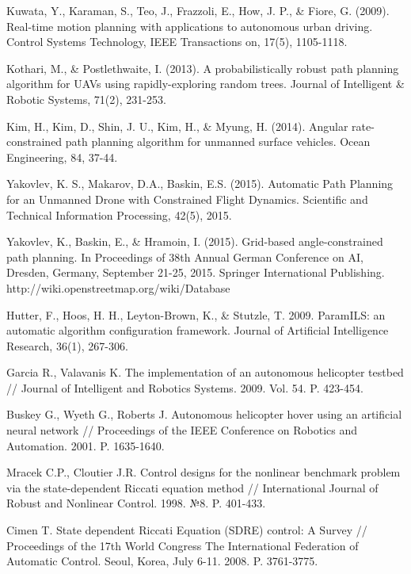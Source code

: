\documentclass[review]{elsarticle}
\begin{document}
\begin{thebibliography}{9}
	 Kuwata, Y., Karaman, S., Teo, J., Frazzoli, E., How, J. P., \& Fiore, G. (2009). Real-time motion planning with applications to autonomous urban driving. Control Systems Technology, IEEE Transactions on, 17(5), 1105-1118.
	
	 Kothari, M., \& Postlethwaite, I. (2013). A probabilistically robust path planning algorithm for UAVs using rapidly-exploring random trees. Journal of Intelligent \& Robotic Systems, 71(2), 231-253.
	
	 Kim, H., Kim, D., Shin, J. U., Kim, H., \& Myung, H. (2014). Angular rate-constrained path planning algorithm for unmanned surface vehicles. Ocean Engineering, 84, 37-44.
	
	 Yakovlev, K. S., Makarov, D.A., Baskin, E.S. (2015). Automatic Path Planning for an Unmanned Drone with Constrained Flight Dynamics. Scientific and Technical Information Processing, 42(5), 2015.
	
	 Yakovlev, K., Baskin, E., \& Hramoin, I. (2015). Grid-based angle-constrained path planning. In Proceedings of 38th Annual German Conference on AI, Dresden, Germany, September 21-25, 2015. Springer International Publishing.
	 http://wiki.openstreetmap.org/wiki/Database
	
	 Hutter, F., Hoos, H. H., Leyton-Brown, K., \& Stutzle, T. 2009. ParamILS: an automatic algorithm configuration framework. Journal of Artificial Intelligence Research, 36(1), 267-306.
	
	 Garcia R., Valavanis K. The implementation of an autonomous helicopter testbed // Journal of Intelligent and Robotics Systems. 2009. Vol. 54. P. 423-454.
	
	 Buskey G., Wyeth G., Roberts J. Autonomous helicopter hover using an artificial neural network // Proceedings of the IEEE Conference on Robotics and Automation. 2001. P. 1635-1640.
	
	 Mracek C.P., Cloutier J.R. Control designs for the nonlinear benchmark problem via the state-dependent Riccati equation method // International Journal of Robust and Nonlinear Control. 1998. №8. P. 401-433.
	
	 Cimen T. State dependent Riccati Equation (SDRE) control: A Survey // Proceedings of the 17th World Congress The International Federation of Automatic Control. Seoul, Korea, July 6-11. 2008. P. 3761-3775.
	

\end{thebibliography}
\end{document}
